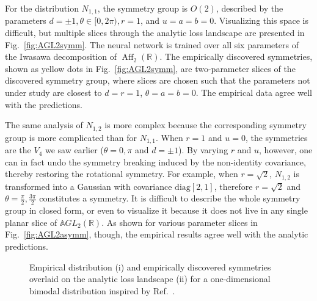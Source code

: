 \documentclass[aps,prx,reprint,preprintnumbers,superscriptaddress,nofootinbib,longbibliography,floatfix]{revtex4-1}
\newcommand{\A}{\mathbb{A}}
\newcommand{\R}{\mathbb{R}}
\DeclareRobustCommand{\Fig}[1]{Fig.~\ref{fig:#1}}
\DeclareRobustCommand{\Ref}[1]{Ref.~\cite{#1}}
\begin{document}
For the distribution $N_{1,1}$, the symmetry group is $O(2)$, described by the parameters $d = \pm 1, \theta\in[0, 2\pi), r = 1$, and $u = a = b = 0$.
%
Visualizing this space is difficult, but multiple slices through the analytic loss landscape are presented in \Fig{AGL2symm}.
%
The neural network is trained over all six parameters of the Iwasawa decomposition of $\operatorname{Aff}_2(\R)$.
%
The empirically discovered symmetries, shown as yellow dots in \Fig{AGL2symm}, are two-parameter slices of the discovered symmetry group, where slices are chosen such that the parameters not under study are closest to $d = r = 1$, $\theta = a = b = 0$.
%
The empirical data agree well with the predictions.





The same analysis of $N_{1,2}$ is more complex because the corresponding symmetry group is more complicated than for $N_{1,1}$.
%
When $r = 1$ and $u = 0$, the symmetries are the $V_4$ we saw earlier ($\theta = 0,\pi$ and $d = \pm 1$).
%
By varying $r$ and $u$, however, one can in fact undo the symmetry breaking induced by the non-identity covariance, thereby restoring the rotational symmetry.
%
For example, when $r = \sqrt{2}$, $N_{1,2}$ is transformed into a Gaussian with covariance $\mathrm{diag}[2,1]$, therefore $r = \sqrt 2$ and $\theta = \frac\pi2, \frac{3\pi}2$ constitutes a symmetry.
%
It is difficult to describe the whole symmetry group in closed form, or even to visualize it because it does not live in any single planar slice of $\A GL_2(\R)$.
%
As shown for various parameter slices in \Fig{AGL2asymm}, though, the empirical results agree well with the analytic predictions.


\begin{figure*}[p]
    \centering
    \caption{
    Empirical distribution (i) and empirically discovered symmetries overlaid on the analytic loss landscape (ii) for a one-dimensional bimodal distribution inspired by \Ref{fisher2018boltzmann}.
    }
    \label{fig:otherdistributions_1D}
\end{figure*}
\end{document}
